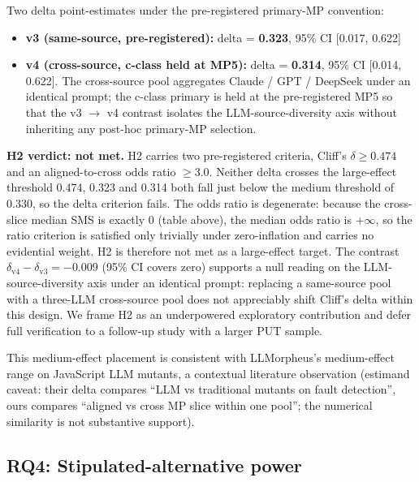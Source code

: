 \documentclass[acmsmall,screen,review]{acmart}
\providecommand{\tightlist}{\setlength{\itemsep}{0pt}\setlength{\parskip}{0pt}}
\begin{document}
Two delta point-estimates under the pre-registered primary-MP
convention:

\begin{itemize}
\tightlist
\item
  \textbf{v3 (same-source, pre-registered):} delta = \textbf{0.323},
  95\% CI {[}0.017, 0.622{]}
\item
  \textbf{v4 (cross-source, c-class held at MP5):} delta =
  \textbf{0.314}, 95\% CI {[}0.014, 0.622{]}. The cross-source pool
  aggregates Claude / GPT / DeepSeek under an identical prompt; the
  c-class primary is held at the pre-registered MP5 so that the v3 $\to$ v4
  contrast isolates the LLM-source-diversity axis without inheriting any
  post-hoc primary-MP selection.
\end{itemize}

\textbf{H2 verdict: not met.} H2 carries two pre-registered criteria,
Cliff's $\delta \geq 0.474$ and an aligned-to-cross odds ratio
$\geq 3.0$. Neither delta crosses the \citet{romano2006cliff}
large-effect threshold 0.474, 0.323 and 0.314 both fall just below the
\citet{romano2006cliff} medium threshold of 0.330, so the delta criterion fails. The
odds ratio is degenerate: because the cross-slice median SMS is exactly
0 (table above), the median odds ratio is $+\infty$, so the ratio
criterion is satisfied only trivially under zero-inflation and carries no
evidential weight. H2 is therefore not met as a large-effect target. The
contrast $\delta_{\mathrm{v4}} - \delta_{\mathrm{v3}} = -0.009$ (95\% CI covers
zero) supports a null reading on the LLM-source-diversity axis under an
identical prompt: replacing a same-source pool with a three-LLM
cross-source pool does not appreciably shift Cliff's delta within this
design. We frame H2 as an underpowered exploratory contribution and
defer full verification to a follow-up study with a larger PUT sample.

This medium-effect placement is consistent with \citet{tip2025llmorpheus}
LLMorpheus's medium-effect range on JavaScript LLM mutants, a contextual
literature observation (estimand caveat: their delta compares ``LLM vs
traditional mutants on fault detection'', ours compares ``aligned vs
cross MP slice within one pool''; the numerical similarity is not
substantive support).

\subsection{RQ4: Stipulated-alternative power}\label{rq2-stipulated-alternative-power}
\end{document}
